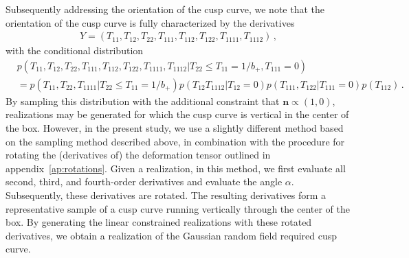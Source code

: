 \documentclass[a4paper, 11pt]{article}
\begin{document}
\bigskip
Subsequently addressing the orientation of the cusp curve, we note that the orientation of the cusp curve is fully characterized by the derivatives  
\begin{align}
Y=(T_{11},T_{12},T_{22},T_{111},T_{112},T_{122},T_{1111},T_{1112})\,,
\end{align}
with the conditional distribution
\begin{align}
&p(T_{11},T_{12},T_{22},T_{111},T_{112},T_{122},T_{1111},T_{1112}|T_{22} \leq T_{11}=1/b_+, T_{111}=0)\\
&=
p(T_{11},T_{22},T_{1111}|T_{22}\leq T_{11}=1/b_+)p(T_{12}T_{1112}|T_{12}=0)p(T_{111},T_{122}|T_{111}=0)p(T_{112})\,.\nonumber
\end{align}
By sampling this distribution with the additional constraint that $\bm{n} \propto (1,0)$, realizations may be generated for which the cusp curve is vertical in the center of the box.  However, in the present study, we use a slightly different method based on the sampling method described above, in combination with the procedure for rotating the (derivatives of) the deformation tensor outlined in appendix~\ref{ap:rotations}. Given a realization, in this method, we first evaluate all second, third, and fourth-order derivatives
and evaluate the angle $\alpha$. Subsequently, these derivatives are rotated. The resulting derivatives form a representative sample of a cusp curve running vertically through the center of the box. By generating the linear constrained realizations with these rotated derivatives, we obtain a realization of the Gaussian random field required cusp curve.

\end{document}
